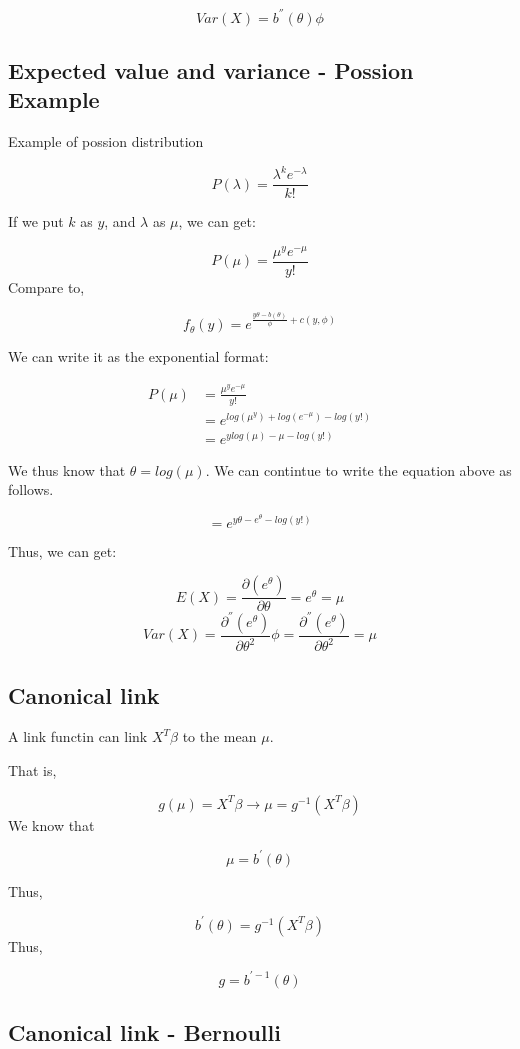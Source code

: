 \documentclass[]{book}
\begin{document}
\[Var(X)=b^{''}(\theta) \phi\]

\subsection{Expected value and variance - Possion
Example}\label{expected-value-and-variance---possion-example}

Example of possion distribution

\[P(\lambda)=\frac{\lambda^k e^{-\lambda}}{k!}\]

If we put \(k\) as \(y\), and \(\lambda\) as \(\mu\), we can get:

\[P(\mu)=\frac{\mu^y e^{-\mu}}{y!}\] Compare to,

\[f_{\theta}(y)=e^{\frac{y\theta-b(\theta)}{\phi}+c(y,\phi)}\]

We can write it as the exponential format:

\[\begin{aligned} P(\mu) &=\frac{\mu^y e^{-\mu}}{y!}  \\ &= e^{log(\mu^y)+log(e^{-\mu})-log(y!)} \\ &= e^{ylog(\mu)-\mu-log(y!)}\end{aligned}\]

We thus know that \(\theta=log(\mu)\). We can contintue to write the
equation above as follows.

\[=e^{y\theta-e^{\theta}-log(y!)}\]

Thus, we can get:

\[E(X)=\frac{\partial (e^{\theta})}{\partial \theta}=e^{\theta}=\mu\]
\[Var(X)=\frac{\partial^{''} (e^{\theta})}{\partial \theta^2} \phi=\frac{\partial^{''} (e^{\theta})}{\partial \theta^2}=\mu\]

\subsection{Canonical link}\label{canonical-link}

A link functin can link \(X^T \beta\) to the mean \(\mu\).

That is,

\[g(\mu)=X^T \beta \rightarrow \mu = g^{-1}(X^T \beta)\] We know that

\[\mu = b^{'}(\theta)\]

Thus,

\[ b^{'}(\theta)=g^{-1}(X^T \beta)\] Thus,

\[g=b^{' -1}(\theta)\]

\subsection{Canonical link -
Bernoulli}\label{canonical-link---bernoulli}
\end{document}

